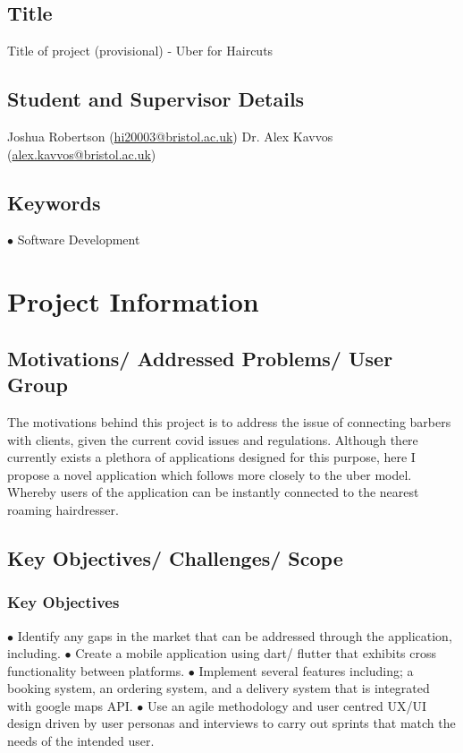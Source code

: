 \documentclass[12pt]{article}
\begin{document}
\subsection{Title}
Title of project (provisional) - Uber for Haircuts

\subsection{Student and Supervisor Details}
Joshua Robertson (\href{mailto:hi20003@bristol.ac.uk}{hi20003@bristol.ac.uk})
\newline
Dr. Alex Kavvos (\href{mailto:alex.kavvos@bristol.ac.uk}{alex.kavvos@bristol.ac.uk})

\subsection{Keywords}
$\bullet$ Software Development
\newline

\section{Project Information}
\subsection{Motivations/ Addressed Problems/ User Group}
The motivations behind this project is to address the issue of connecting barbers with clients, given the current covid issues and regulations. Although there currently exists a plethora of applications designed for this purpose, here I propose a novel application which follows more closely to the uber model. Whereby users of the application can be instantly connected to the nearest roaming hairdresser. 

\subsection{Key Objectives/ Challenges/ Scope}
\subsubsection{Key Objectives}
$\bullet$ Identify any gaps in the market that can be addressed through the application, including.
\newline
$\bullet$ Create a mobile application using dart/ flutter that exhibits cross functionality between platforms.
\newline
$\bullet$ Implement several features including; a booking system, an ordering system, and a delivery system that is integrated with google maps API.
\newline
$\bullet$ Use an agile methodology and user centred UX/UI design driven by user personas and interviews to carry out sprints that match the needs of the intended user.
\newline
\end{document}
